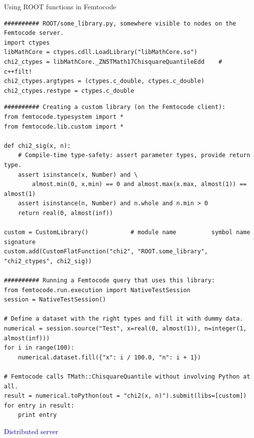 \documentclass{beamer}
\begin{document}
\begin{frame}[fragile]{Using ROOT functions in Femtocode}
\vspace{0.1 cm}
\tiny
\begin{verbatim}
########## ROOT/some_library.py, somewhere visible to nodes on the Femtocode server.
import ctypes
libMathCore = ctypes.cdll.LoadLibrary("libMathCore.so")
chi2_ctypes = libMathCore._ZN5TMath17ChisquareQuantileEdd    # c++filt!
chi2_ctypes.argtypes = (ctypes.c_double, ctypes.c_double)
chi2_ctypes.restype = ctypes.c_double
\end{verbatim}

\begin{verbatim}
########## Creating a custom library (on the Femtocode client):
from femtocode.typesystem import *
from femtocode.lib.custom import *

def chi2_sig(x, n):
    # Compile-time type-safety: assert parameter types, provide return type.
    assert isinstance(x, Number) and \
        almost.min(0, x.min) == 0 and almost.max(x.max, almost(1)) == almost(1)
    assert isinstance(n, Number) and n.whole and n.min > 0
    return real(0, almost(inf))

custom = CustomLibrary()            # module name          symbol name    signature
custom.add(CustomFlatFunction("chi2", "ROOT.some_library", "chi2_ctypes", chi2_sig))

########## Running a Femtocode query that uses this library:
from femtocode.run.execution import NativeTestSession
session = NativeTestSession()

# Define a dataset with the right types and fill it with dummy data.
numerical = session.source("Test", x=real(0, almost(1)), n=integer(1, almost(inf)))
for i in range(100):
    numerical.dataset.fill({"x": i / 100.0, "n": i + 1})

# Femtocode calls TMath::ChisquareQuantile without involving Python at all.
result = numerical.toPython(out = "chi2(x, n)").submit(libs=[custom])
for entry in result:
    print entry
\end{verbatim}
\end{frame}

\begin{frame}{}
\begin{center}
\LARGE \textcolor{darkblue}{Distributed server}
\end{center}
\end{frame}
\end{document}
